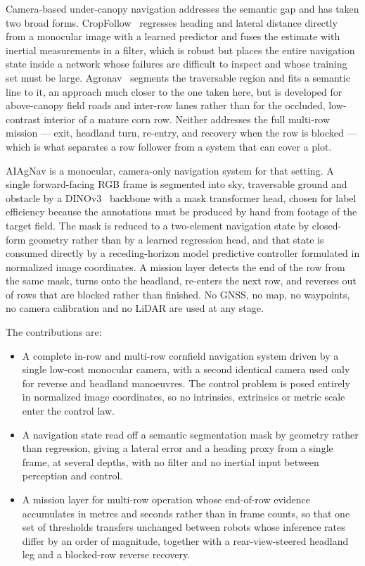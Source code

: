 \documentclass[conference]{IEEEtran}
\begin{document}
Camera-based under-canopy navigation addresses the semantic gap and has taken
two broad forms. CropFollow~\cite{sivakumar2021cropfollow} regresses heading and
lateral distance directly from a monocular image with a learned predictor and
fuses the estimate with inertial measurements in a filter, which is robust but
places the entire navigation state inside a network whose failures are difficult
to inspect and whose training set must be large. Agronav~\cite{panda2023agronav}
segments the traversable region and fits a semantic line to it, an approach much
closer to the one taken here, but is developed for above-canopy field roads and
inter-row lanes rather than for the occluded, low-contrast interior of a mature
corn row. Neither addresses the full multi-row mission --- exit, headland turn,
re-entry, and recovery when the row is blocked --- which is what separates a
row follower from a system that can cover a plot.

AIAgNav is a monocular, camera-only navigation system for that setting. A
single forward-facing RGB frame is segmented into sky, traversable ground and
obstacle by a DINOv3~\cite{simeoni2025dinov3} backbone with a mask transformer
head, chosen for label efficiency because the annotations must be produced by
hand from footage of the target field. The mask is reduced to a two-element
navigation state by closed-form geometry rather than by a learned regression
head, and that state is consumed directly by a receding-horizon model predictive
controller formulated in normalized image coordinates. A mission layer detects
the end of the row from the same mask, turns onto the headland, re-enters the
next row, and reverses out of rows that are blocked rather than finished. No
GNSS, no map, no waypoints, no camera calibration and no LiDAR are used at any
stage.

The contributions are:

\begin{itemize}
\item A complete in-row and multi-row cornfield navigation system driven by a
single low-cost monocular camera, with a second identical camera used only for
reverse and headland manoeuvres. The control problem is posed entirely in
normalized image coordinates, so no intrinsics, extrinsics or metric scale enter
the control law.
\item A navigation state read off a semantic segmentation mask by geometry
rather than regression, giving a lateral error and a heading proxy from a single
frame, at several depths, with no filter and no inertial input between
perception and control.
\item A mission layer for multi-row operation whose end-of-row evidence
accumulates in metres and seconds rather than in frame counts, so that one set
of thresholds transfers unchanged between robots whose inference rates differ by
an order of magnitude, together with a rear-view-steered headland leg and a
blocked-row reverse recovery.
\end{itemize}
\end{document}
